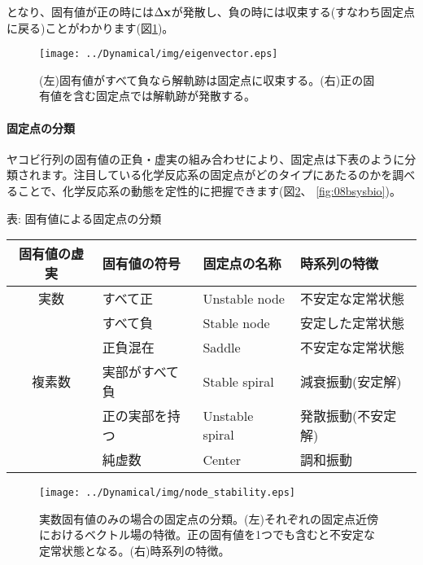 となり、固有値が正の時には\(\Delta {\bf x}\)が発散し、負の時には収束する(すなわち固定点に戻る)ことがわかります(図\ref{fig:07sysbio})。

\begin{figure}[ht]
        \centering \texttt{[image: ../Dynamical/img/eigenvector.eps]}
        \caption{(左)固有値がすべて負なら解軌跡は固定点に収束する。(右)正の固有値を含む固定点では解軌跡が発散する。}
        \label{fig:07sysbio} \end{figure}


\paragraph{固定点の分類} ヤコビ行列の固有値の正負・虚実の組み合わせにより、固定点は下表のように分類されます。注目している化学反応系の固定点がどのタイプにあたるのかを調べることで、化学反応系の動態を定性的に把握できます(図\ref{fig:08asysbio}、 \ref{fig:08bsysbio})。\\

\begin{center}
表: 固有値による固定点の分類\\
\begin{tabular}{clll}
\hline
固有値の虚実 & 固有値の符号       & 固定点の名称 & 時系列の特徴 \\
\hline
実数  & すべて正         & Unstable node  & 不安定な定常状態\\
　　　& すべて負         & Stable node    & 安定した定常状態\\
      & 正負混在         & Saddle         & 不安定な定常状態\\
\hline
複素数 & 実部がすべて負  & Stable spiral  & 減衰振動(安定解)\\
　　　 & 正の実部を持つ  & Unstable spiral & 発散振動(不安定解)\\
       & 純虚数          & Center          & 調和振動\\
\hline
\end{tabular}
\end{center}

\begin{figure}[ht]
        \centering \texttt{[image: ../Dynamical/img/node\_stability.eps]}
                \caption{実数固有値のみの場合の固定点の分類。(左)それぞれの固定点近傍におけるベクトル場の特徴。正の固有値を1つでも含むと不安定な定常状態となる。(右)時系列の特徴。}
        \label{fig:08asysbio} \end{figure}
        

